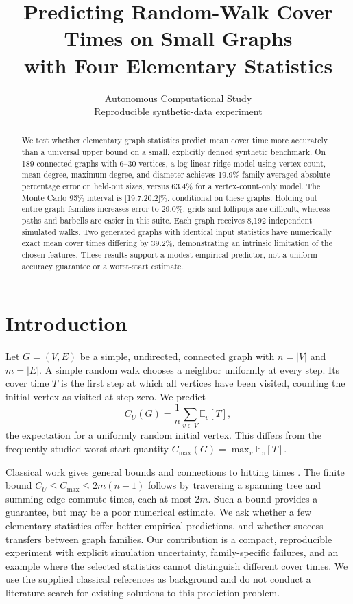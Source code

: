 \documentclass{article}
\title{Predicting Random-Walk Cover Times on Small Graphs\\with Four Elementary Statistics}
\author{Autonomous Computational Study\\Reproducible synthetic-data experiment}
\begin{document}
\maketitle
\begin{abstract}
We test whether elementary graph statistics predict mean cover time more accurately than a universal upper bound on a small, explicitly defined synthetic benchmark. On 189 connected graphs with 6--30 vertices, a log-linear ridge model using vertex count, mean degree, maximum degree, and diameter achieves 19.9\% family-averaged absolute percentage error on held-out sizes, versus 63.4\% for a vertex-count-only model. The Monte Carlo 95\% interval is [19.7,20.2]\%, conditional on these graphs. Holding out entire graph families increases error to 29.0\%; grids and lollipops are difficult, whereas paths and barbells are easier in this suite. Each graph receives 8,192 independent simulated walks. Two generated graphs with identical input statistics have numerically exact mean cover times differing by 39.2\%, demonstrating an intrinsic limitation of the chosen features. These results support a modest empirical predictor, not a uniform accuracy guarantee or a worst-start estimate.
\end{abstract}

\section{Introduction}
Let $G=(V,E)$ be a simple, undirected, connected graph with $n=|V|$ and $m=|E|$. A simple random walk chooses a neighbor uniformly at every step. Its cover time $T$ is the first step at which all vertices have been visited, counting the initial vertex as visited at step zero. We predict
\begin{equation}
 C_U(G)=\frac1n\sum_{v\in V}\mathbb{E}_v[T],
\end{equation}
the expectation for a uniformly random initial vertex. This differs from the frequently studied worst-start quantity $C_{\max}(G)=\max_v\mathbb{E}_v[T]$.

Classical work gives general bounds and connections to hitting times \citep{aleliunas1979,lovasz1993,feige1995}. The finite bound $C_U\leq C_{\max}\leq 2m(n-1)$ follows by traversing a spanning tree and summing edge commute times, each at most $2m$. Such a bound provides a guarantee, but may be a poor numerical estimate. We ask whether a few elementary statistics offer better empirical predictions, and whether success transfers between graph families. Our contribution is a compact, reproducible experiment with explicit simulation uncertainty, family-specific failures, and an example where the selected statistics cannot distinguish different cover times. We use the supplied classical references as background and do not conduct a literature search for existing solutions to this prediction problem.
\end{document}
